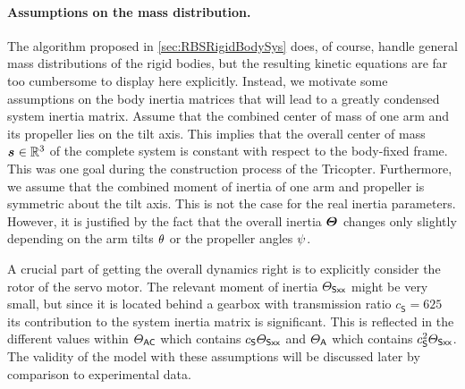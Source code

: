 \paragraph{Assumptions on the mass distribution.}
The algorithm proposed in \autoref{sec:RBSRigidBodySys} does, of course, handle general mass distributions of the rigid bodies, but the resulting kinetic equations are far too cumbersome to display here explicitly.
Instead, we motivate some assumptions on the body inertia matrices that will lead to a greatly condensed system inertia matrix.
Assume that the combined center of mass of one arm and its propeller lies on the tilt axis.
This implies that the overall center of mass $\bodyCOM{}{}{} \in \RealNum^{3}$ of the complete system is constant with respect to the body-fixed frame.
This was one goal during the construction process of the Tricopter.
Furthermore, we assume that the combined moment of inertia of one arm and propeller is symmetric about the tilt axis.
This is not the case for the real inertia parameters.
However, it is justified by the fact that the overall inertia $\bodyMOI{}{}{}$ changes only slightly depending on the arm tilts $\theta_{}$ or the propeller angles $\psi_{}$.  

A crucial part of getting the overall dynamics right is to explicitly consider the rotor of the servo motor.
The relevant moment of inertia $\varTheta_{\textsf{Sxx}}$ might be very small, but since it is located behind a gearbox with transmission ratio $c_{\mathsf{S}} = 625$ its contribution to the system inertia matrix is significant.
This is reflected in the different values within $\varTheta_{\mathsf{AC}}$ which contains $c_{\mathsf{S}} \varTheta_{\textsf{Sxx}}$ and $\varTheta_{\mathsf{A}}$ which contains $c_{\mathsf{S}}^2 \varTheta_{\textsf{Sxx}}$.
The validity of the model with these assumptions will be discussed later by comparison to experimental data.

